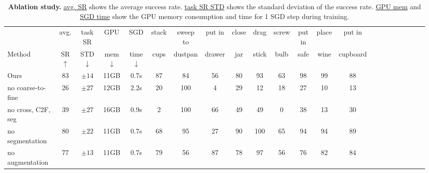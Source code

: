 
\begin{table*}[!ht]
\centering
\scriptsize
\begin{tabular}{lccccccccccccccccccccc}
\toprule
                    & avg.          & task SR      & GPU              & SGD                & stack     & sweep to  & put in    & close & drag  & screw  & put in   & place & put in      \\
Method              & SR $\uparrow$ &STD $\downarrow$& mem $\downarrow$ & time $\downarrow$  & cups      & dustpan   & drawer    & jar   & stick & bulb   & safe     & wine  & cupboard   \\ \midrule

Ours                & 83            & $\pm14$         & 11GB              & 0.7s              &  87       &  84       &  56       &  80   &  93   &  63    &  98      &  99   &  88       \\
no coarse-to-fine \footnotemark &26 & $\pm27$         & 12GB              & 2.2s              &  20       & 100       &   4       &  29   &  12   &  18    &  27      &  10   &  13       \\
no cross, C2F, seg  & 39            & $\pm27$         & 16GB              & 0.9s              &   2       & 100       &  66       &  49   &  49   &   0    &  38      &  13   &  30       \\
no segmentation     & 80            & $\pm22$         & 11GB              & 0.7s              &  68       &  95       &  27       &  90   & 100   &  65    &  94      &  94   &  89       \\
no augmentation     & 77            & $\pm13$         & 11GB              & 0.7s              &  79       &  56       &  87       &  78   &  97   &  56    &  76      &  82   &  84       \\
\bottomrule
\end{tabular}
\caption{\textbf{Ablation study.} 
\underline{avg. SR} shows the average success rate. \underline{task SR STD} shows the standard deviation of the success rate. \underline{GPU mem} and \underline{SGD time} show the GPU memory consumption and time for 1 SGD step during training.}
\vspace{-0.5cm}
\label{table:full_ablation}
\end{table*}

